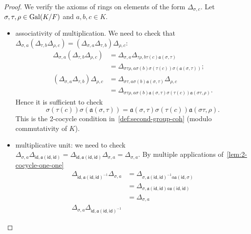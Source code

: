\begin{proof}
  We verify the axioms of rings on elements of the form $\Delta_{\sigma, c}$. Let $\sigma,\tau,\rho\in\operatorname{Gal}(K/F)$ and $a,b,c\in K$.
  \begin{itemize}
    \item associativity of multiplication. We need to check that $\Delta_{\sigma,a}\left(\Delta_{\tau,b}\Delta_{\rho,c}\right) = \left(\Delta_{\sigma,a}\Delta_{\tau,b}\right)\Delta_{\rho,c}$:
          \[
          \begin{aligned}
            \Delta_{\sigma, a}\left(\Delta_{\tau,b}\Delta_{\rho,c}\right)
            &= \Delta_{\sigma,a}\Delta_{\tau\rho,b\tau(c) \mathfrak{a}(\sigma,\tau)}\\
            &= \Delta_{\sigma\tau\rho,a\sigma(b)\sigma(\tau(c)) \sigma(\mathfrak{a}(\sigma, \tau))};\\
            \left(\Delta_{\sigma,a}\Delta_{\tau,b}\right)\Delta_{\rho,c}
            &= \Delta_{\sigma\tau,a\sigma(b)\mathfrak{a}(\sigma,\tau)}\Delta_{\rho,c}\\
            &= \Delta_{\sigma\tau\rho,a\sigma(b)\mathfrak{a}(\sigma, \tau)\sigma(\tau(c))\mathfrak{a}(\sigma\tau, \rho)}.
          \end{aligned}
          \]
          Hence it is sufficient to check
          \[
          \sigma(\tau(c))\sigma(\mathfrak{a}(\sigma,\tau)) =
          \mathfrak{a}(\sigma,\tau)\sigma(\tau(c))\mathfrak{a}(\sigma\tau, \rho).
          \]
          This is the 2-cocycle condition in~\cref{def:second-group-coh} (modulo commutativity of $K$).
    \item multiplicative unit: we need to check $\Delta_{\sigma, a}\Delta_{\mathsf{id},\mathfrak{a}(\mathsf{id}, \mathsf{id})} = \Delta_{\mathsf{id},\mathfrak{a}(\mathsf{id},\mathsf{id})}\Delta_{\sigma, a} = \Delta_{\sigma, a}$. By multiple applications of~\cref{lem:2-cocycle-one-one}
          \[
          \begin{aligned}
            \Delta_{\mathsf{id},\mathfrak{a}(\mathsf{id}, \mathsf{id})^{-1}}\Delta_{\sigma, a}
            &= \Delta_{\sigma, \mathfrak{a}(\mathsf{id}, \mathsf{id})^{-1}a\mathfrak{a}(\mathsf{id},\sigma)}\\
            &= \Delta_{\sigma, \mathfrak{a}(\mathsf{id}, \mathsf{id}) a\mathfrak{a}(\mathsf{id},\mathsf{id})}\\
            &= \Delta_{\sigma, a} \\
            \Delta_{\sigma, a}\Delta_{\mathsf{id},\mathfrak{a}(\mathsf{id},\mathsf{id})^{-1}}

\end{aligned}\]
\end{itemize}
\end{proof}

